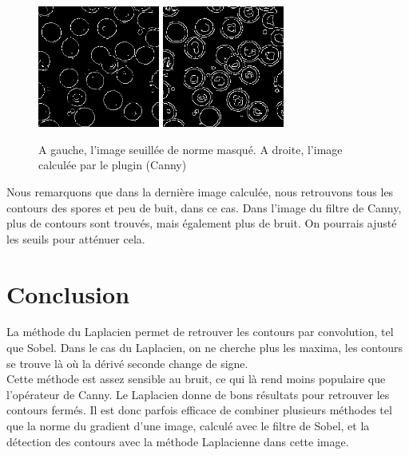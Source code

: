 \documentclass[a4paper,11pt]{article}
\begin{document}
  \begin{figure}[H]
   \center
   \includegraphics[width=4cm]{../result_laplacien.png}
   \includegraphics[width=4cm]{../canny.png}
   \caption{A gauche, l'image seuillée de norme masqué. A droite, l'image calculée par le plugin (Canny)}
  \end{figure}
  
  Nous remarquons que dans la dernière image calculée, nous retrouvons tous les contours des spores et peu 
  de buit, dans ce cas. Dans l'image du filtre de Canny, plus de contours sont trouvés, mais également plus 
  de bruit. On pourrais ajusté les seuils pour atténuer cela.
  
  \section{Conclusion}
  La méthode du Laplacien permet de retrouver les contours par convolution, tel que Sobel. Dans le cas du Laplacien,
  on ne cherche plus les maxima, les contours se trouve là où la dérivé seconde change de signe.\\
  
  Cette méthode est assez sensible au bruit, ce qui là rend moins populaire que l'opérateur de Canny. Le Laplacien 
  donne de bons résultats pour retrouver les contours fermés. Il est donc parfois efficace de combiner plusieurs
  méthodes tel que la norme du gradient d'une image, calculé avec le filtre de Sobel, et la détection des contours
  avec la méthode Laplacienne dans cette image.
\end{document}
